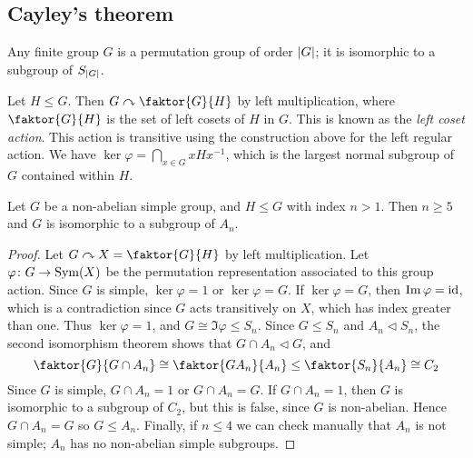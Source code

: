 \subsection{Cayley's theorem}
\begin{theorem}
	Any finite group \( G \) is a permutation group of order \( \abs{G} \); it is isomorphic to a subgroup of \( S_\abs{G} \).
\end{theorem}
\begin{example}
	Let \( H \leq G \).
	Then \( G \acts \faktor{G}{H} \) by left multiplication, where \( \faktor{G}{H} \) is the set of left cosets of \( H \) in \( G \).
	This is known as the \textit{left coset action}.
	This action is transitive using the construction above for the left regular action.
	We have \( \ker\varphi = \bigcap_{x \in G} xHx^{-1} \), which is the largest normal subgroup of \( G \) contained within \( H \).
\end{example}
\begin{theorem}
	Let \( G \) be a non-abelian simple group, and \( H \leq G \) with index \( n > 1 \).
	Then \( n \geq 5 \) and \( G \) is isomorphic to a subgroup of \( A_n \).
\end{theorem}
\begin{proof}
	Let \( G \acts X = \faktor{G}{H} \) by left multiplication.
	Let \( \varphi \colon G \to \operatorname{Sym}(X) \) be the permutation representation associated to this group action.
	Since \( G \) is simple, \( \ker \varphi = 1 \) or \( \ker \varphi = G \).
	If \( \ker \varphi = G \), then \( \operatorname{Im}\varphi = \operatorname{id} \), which is a contradiction since \( G \) acts transitively on \( X \), which has index greater than one.
	Thus \( \ker \varphi = 1 \), and \( G \cong \Im\varphi \leq S_n \).
	Since \( G \leq S_n \) and \( A_n \vartriangleleft S_n \), the second isomorphism theorem shows that \( G \cap A_n \vartriangleleft G \), and
	\[
		\faktor{G}{G \cap A_n} \cong \faktor{GA_n}{A_n} \leq \faktor{S_n}{A_n} \cong C_2
	\]
	Since \( G \) is simple, \( G \cap A_n = 1 \) or \( G \cap A_n = G \).
	If \( G \cap A_n = 1 \), then \( G \) is isomorphic to a subgroup of \( C_2 \), but this is false, since \( G \) is non-abelian.
	Hence \( G \cap A_n = G \) so \( G \leq A_n \).
	Finally, if \( n \leq 4 \) we can check manually that \( A_n \) is not simple; \( A_n \) has no non-abelian simple subgroups.
\end{proof}

